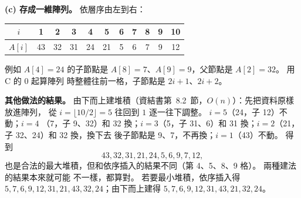 \begin{pastsoln}
\textbf{(c) 存成一維陣列。} 依層序由左到右：
\begin{center}
\begin{tabular}{c|cccccccccc}
$i$ & 1 & 2 & 3 & 4 & 5 & 6 & 7 & 8 & 9 & 10 \\
\hline
$A[i]$ & 43 & 32 & 31 & 24 & 21 & 5 & 6 & 7 & 9 & 12 \\
\end{tabular}
\end{center}
例如 $A[4] = 24$ 的子節點是 $A[8] = 7$、$A[9] = 9$，父節點是 $A[2] = 32$。 用 C 的 $0$ 起算陣列
時整體往前一格，子節點是 $2i + 1$、$2i + 2$。

\textbf{其他做法的結果。} 由下而上建堆積（資結書第~8.2~節，$O(n)$）：先把資料原樣放進陣列，
從 $i = \lfloor 10/2 \rfloor = 5$ 往回到 $1$ 逐一往下調整。 $i = 5$（24，子 12）不動；$i = 4$
（7，子 9、32）和 32 換；$i = 3$（5，子 31、6）和 31 換；$i = 2$（21，子 32、24）和 32 換，換下去
後子節點是 9、7，不再換；$i = 1$（43）不動。 得到
\[
43, 32, 31, 21, 24, 5, 6, 9, 7, 12,
\]
也是合法的最大堆積，但和依序插入的結果不同（第 4、5、8、9 格）。 兩種建法的結果本來就可能
不一樣，都算對。 若要最小堆積，依序插入得 $5, 7, 6, 9, 12, 31, 21, 43, 32, 24$；由下而上建得
$5, 7, 6, 9, 12, 31, 43, 21, 32, 24$。
\end{pastsoln}
